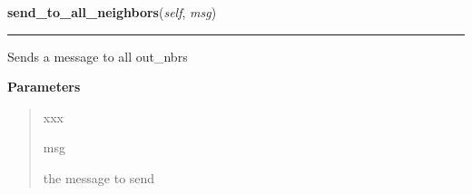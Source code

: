 \hspace{.8\funcindent}\begin{boxedminipage}{\funcwidth}

    \raggedright \textbf{send\_to\_all\_neighbors}(\textit{self}, \textit{msg})

    \vspace{-1.5ex}

    \rule{\textwidth}{0.5\fboxrule}
\setlength{\parskip}{2ex}
    Sends a message to all out\_nbrs

\setlength{\parskip}{1ex}
      \textbf{Parameters}
      \vspace{-1ex}

      \begin{quote}
        \begin{Ventry}{xxx}

          \item[msg]

          the message to send

        \end{Ventry}

      \end{quote}

    \end{boxedminipage}

    \label{datk:core:distalgs:Process:send_msg}

    \vspace{0.5ex}

